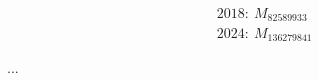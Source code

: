 \documentclass[12pt]{article}
\theoremstyle{definition}
\begin{document}
\[\begin{aligned}
& 2018:\ M_{82589933}\\
& 2024:\  M_{136279841}
\end{aligned}\]

...



%	
%
\end{document}
